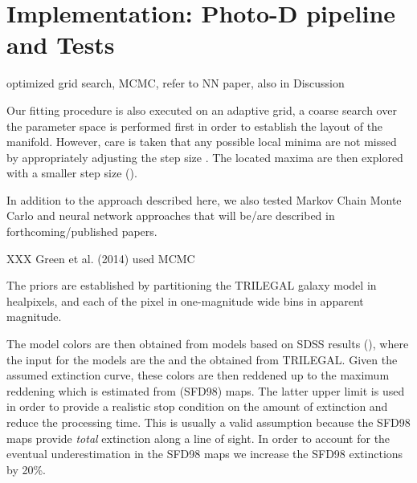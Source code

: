  




\section{Implementation: Photo-D pipeline and Tests}

optimized grid search, MCMC, refer to NN paper, also in Discussion

Our fitting procedure is also executed on an adaptive grid, a coarse search over the parameter space is performed first in order to establish the layout of the manifold. However, care is taken that any possible local minima are not missed by appropriately adjusting the step size . The located maxima are then explored with a smaller step size ().

In addition to the approach described here, we also tested Markov Chain Monte Carlo and neural network approaches that will be/are described in forthcoming/published papers.







 XXX Green et al. (2014) used MCMC 





The priors are established by partitioning the TRILEGAL galaxy model
\citep{dal_tio_simulating_2022} in healpixels,
and each of the pixel in one-magnitude wide bins in apparent
magnitude.

The model colors are then obtained from models based on SDSS results (), where the input for the models are the \Mr and the \feh obtained from TRILEGAL. Given the assumed extinction curve, these colors are then reddened up to the maximum reddening which is estimated from \cite{schlegel_maps_1998} (SFD98) maps. The latter upper limit is used in order to provide a realistic stop condition on the amount of extinction and reduce the processing time. This is usually a valid assumption because the SFD98 maps provide \textit{total} extinction along a line of sight. In order to account for the eventual underestimation in the SFD98 maps we increase the SFD98 extinctions by 20\%.



